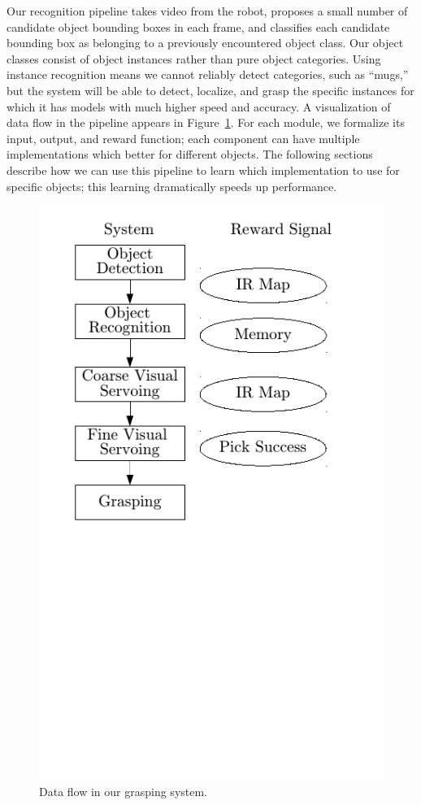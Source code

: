 \documentclass{article}
\begin{document}
Our recognition pipeline takes video from the robot, proposes a small
number of candidate object bounding boxes in each frame, and
classifies each candidate bounding box as belonging to a previously
encountered object class. Our object classes consist of object
instances rather than pure object categories.  Using instance
recognition means we cannot reliably detect categories, such as
``mugs,'' but the system will be able to detect, localize, and grasp
the specific instances for which it has models with much higher speed
and accuracy.  A visualization of data flow in the pipeline appears in
Figure~\ref{fig:system}.  For each module, we formalize its input,
output, and reward function; each component can have multiple
implementations which better for different objects.  The following
sections describe how we can use this pipeline to learn which
implementation to use for specific objects; this learning dramatically
speeds up performance.

\begin{figure}
\includegraphics{system.pdf}
\caption{Data flow in our grasping system.\label{fig:system}}
\end{figure}
\end{document}
